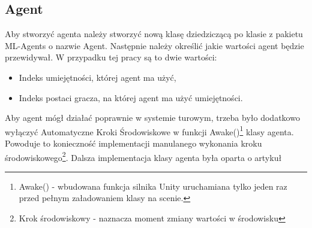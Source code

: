 \documentclass{SGGW-thesis}
\begin{document}
\subsection{Agent}
Aby stworzyć agenta należy stworzyć nową klasę dziedziczącą po klasie z pakietu ML-Agents o nazwie Agent. Następnie należy określić jakie wartości agent będzie przewidywał. W przypadku tej pracy są to dwie wartości:
\begin{itemize}
  \item Indeks umiejętności, której agent ma użyć,
  \item Indeks postaci gracza, na której agent ma użyć umiejętności.
\end{itemize}
Aby agent mógł działać poprawnie w systemie turowym, trzeba było dodatkowo wyłączyć Automatyczne Kroki Środowiskowe w funkcji Awake()\footnote{Awake() - wbudowana funkcja silnika Unity uruchamiana tylko jeden raz przed pełnym załadowaniem klasy na scenie.} klasy agenta.
Powoduje to konieczność implementacji manulanego wykonania kroku środowiskowego\footnote{Krok środowiskowy - naznacza moment zmiany wartości w środowisku}.
Dalsza implementacja klasy agenta była oparta o artykuł \cite{MLAgentsStartegyGuide}

\pagebreak
\end{document}
